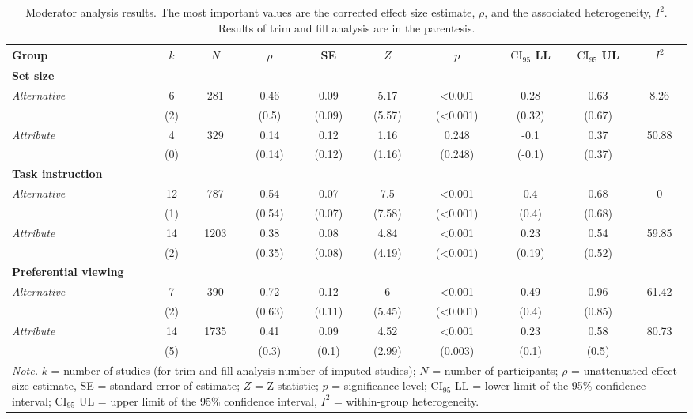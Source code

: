 \begin{table}[ht]
\centering
\caption{Moderator analysis results. The most important values are the corrected effect size estimate, $\rho$, and the associated heterogeneity, $I^2$. Results of trim and fill analysis are in the parentesis.} 
\label{tab:mod_results}
\begingroup\small
\begin{tabular}{lccccccccc}
  \hline
Group & $k$ & $N$ & $\rho$ & SE & $Z$ & $p$ & $\textrm{CI}_{95}$ LL & $\textrm{CI}_{95}$ UL & $I^2$ \\ 
  \hline
\textbf{Set size} &  &  &  &  &  &  &  &  &  \\ 
  \hspace{2mm}\textit{Alternative} & 6 & 281 & 0.46 & 0.09 & 5.17 & <0.001 & 0.28 & 0.63 & 8.26 \\ 
   & (2) &  & (0.5) & (0.09) & (5.57) & (<0.001) & (0.32) & (0.67) &  \\ 
  \hspace{2mm}\textit{Attribute} & 4 & 329 & 0.14 & 0.12 & 1.16 & 0.248 & -0.1 & 0.37 & 50.88 \\ 
   & (0) &  & (0.14) & (0.12) & (1.16) & (0.248) & (-0.1) & (0.37) &  \\ 
  \textbf{Task instruction} &  &  &  &  &  &  &  &  &  \\ 
  \hspace{2mm}\textit{Alternative} & 12 & 787 & 0.54 & 0.07 & 7.5 & <0.001 & 0.4 & 0.68 & 0 \\ 
   & (1) &  & (0.54) & (0.07) & (7.58) & (<0.001) & (0.4) & (0.68) &  \\ 
  \hspace{2mm}\textit{Attribute} & 14 & 1203 & 0.38 & 0.08 & 4.84 & <0.001 & 0.23 & 0.54 & 59.85 \\ 
   & (2) &  & (0.35) & (0.08) & (4.19) & (<0.001) & (0.19) & (0.52) &  \\ 
  \textbf{Preferential viewing} &  &  &  &  &  &  &  &  &  \\ 
  \hspace{2mm}\textit{Alternative} & 7 & 390 & 0.72 & 0.12 & 6 & <0.001 & 0.49 & 0.96 & 61.42 \\ 
   & (2) &  & (0.63) & (0.11) & (5.45) & (<0.001) & (0.4) & (0.85) &  \\ 
  \hspace{2mm}\textit{Attribute} & 14 & 1735 & 0.41 & 0.09 & 4.52 & <0.001 & 0.23 & 0.58 & 80.73 \\ 
   & (5) &  & (0.3) & (0.1) & (2.99) & (0.003) & (0.1) & (0.5) &  \\ 
   \hline 
 \multicolumn{10}{p{0.9\textwidth}}{\scriptsize{\textit{Note.} $k$ = number of studies (for trim and fill analysis number of imputed studies); $N$ = number of participants; $\rho$ = unattenuated effect size estimate, SE = standard error of estimate; $Z$ = Z statistic; $p$ = significance level; $\textrm{CI}_{95}$ LL = lower limit of the 95\% confidence interval; $\textrm{CI}_{95}$ UL = upper limit of the 95\% confidence interval, $I^2$ = within-group heterogeneity.}} 
\end{tabular}
\endgroup
\end{table}

